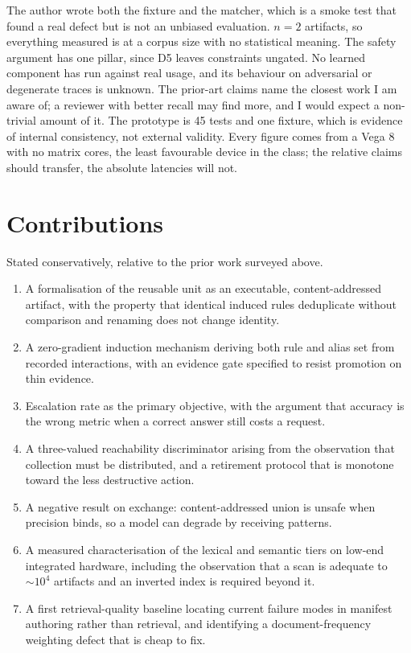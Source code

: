 \documentclass[11pt,twocolumn]{article}
\begin{document}
The author wrote both the fixture and the matcher, which is a smoke test that
found a real defect but is not an unbiased evaluation. $n = 2$ artifacts, so
everything measured is at a corpus size with no statistical meaning. The safety
argument has one pillar, since D5 leaves constraints ungated. No learned
component has run against real usage, and its behaviour on adversarial or
degenerate traces is unknown. The prior-art claims name the closest work I am
aware of; a reviewer with better recall may find more, and I would expect a
non-trivial amount of it. The prototype is 45 tests and one fixture, which is
evidence of internal consistency, not external validity. Every figure comes
from a Vega 8 with no matrix cores, the least favourable device in the class;
the relative claims should transfer, the absolute latencies will not.

\section{Contributions}

Stated conservatively, relative to the prior work surveyed above.

\begin{enumerate}
\item A formalisation of the reusable unit as an executable, content-addressed
      artifact, with the property that identical induced rules deduplicate
      without comparison and renaming does not change identity.
\item A zero-gradient induction mechanism deriving both rule and alias set from
      recorded interactions, with an evidence gate specified to resist promotion
      on thin evidence.
\item Escalation rate as the primary objective, with the argument that accuracy
      is the wrong metric when a correct answer still costs a request.
\item A three-valued reachability discriminator arising from the observation that
      collection must be distributed, and a retirement protocol that is monotone
      toward the less destructive action.
\item A negative result on exchange: content-addressed union is unsafe when
      precision binds, so a model can degrade by receiving patterns.
\item A measured characterisation of the lexical and semantic tiers on low-end
      integrated hardware, including the observation that a scan is adequate to
      $\sim 10^{4}$ artifacts and an inverted index is required beyond it.
\item A first retrieval-quality baseline locating current failure modes in
      manifest authoring rather than retrieval, and identifying a
      document-frequency weighting defect that is cheap to fix.
\end{enumerate}
\end{document}
